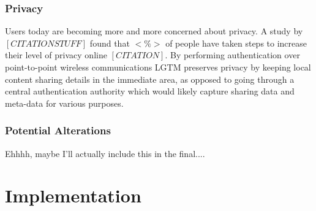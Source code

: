 \documentclass[12pt]{report}
\begin{document}
\subsection{Privacy}
Users today are becoming more and more concerned about privacy. A study by $[CITATION STUFF]$ found that $<\%>$ of people have taken steps to increase their level of privacy online $[CITATION]$. By performing authentication over point-to-point wireless communications LGTM preserves privacy by keeping local content sharing details in the immediate area, as opposed to going through a central authentication authority which would likely capture sharing data and meta-data for various purposes. \\

\subsection{Potential Alterations}  %
Ehhhh, maybe I'll actually include this in the final.... \\

\chapter{Implementation}
\end{document}
